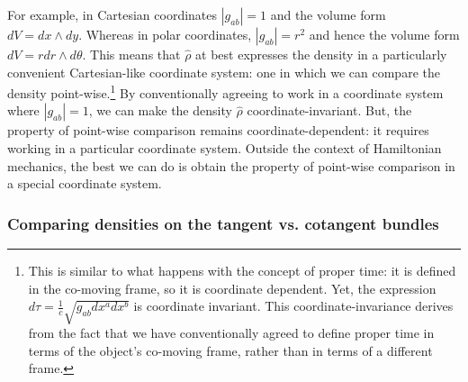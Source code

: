 \documentclass[letterpaper]{article}
\begin{document}
For example, in Cartesian coordinates $|g_{ab}| = 1$ and the volume form $dV = dx \wedge dy$. Whereas in polar coordinates, $|g_{ab}| = r^2$ and hence the volume form $dV = r dr \wedge d\theta$. This means that $\hat{\rho}$ at best expresses the density in a particularly convenient Cartesian-like coordinate system: one in which we can compare the density point-wise.\footnote{This is similar to what happens with the concept of proper time: it is defined in the co-moving frame, so it is coordinate dependent. Yet, the expression $d\tau = \frac{1}{c} \sqrt{g_{ab} dx^a dx^b}$ is coordinate invariant. This coordinate-invariance derives from the fact that we have conventionally agreed to define proper time in terms of the object's co-moving frame, rather than in terms of a different frame.} By conventionally agreeing to work in a coordinate system where $|g_{ab}| = 1$, we can make the density $\hat{\rho}$ coordinate-invariant. But, the property of point-wise comparison remains coordinate-dependent: it requires working in a particular coordinate system. Outside the context of Hamiltonian mechanics, the best we can do is obtain the property of point-wise comparison in a special coordinate system.



\subsubsection{Comparing densities on the tangent vs. cotangent bundles}
\label{comparing}
\end{document}
